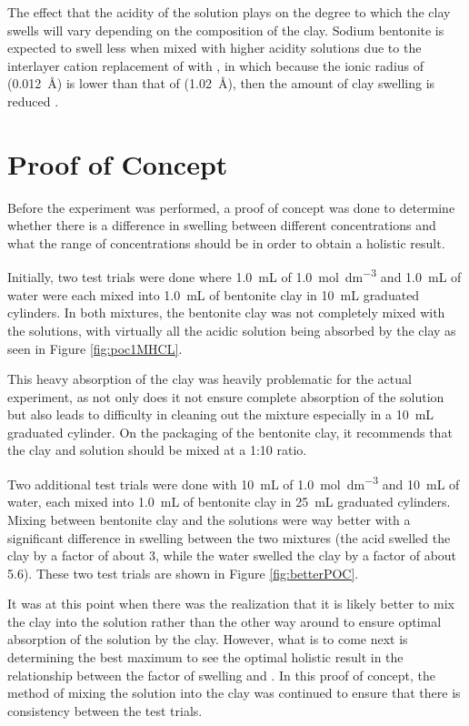 \documentclass[11pt, letterpaper]{article}
\begin{document}
The effect that the acidity of the solution plays on the degree to which
the clay swells will vary depending on the composition of the clay.
Sodium bentonite is expected to swell less when mixed with higher acidity
solutions due to the interlayer cation replacement
of  with , in which because the
ionic radius of  (\SI{0.012}{\angstrom})
is lower than that of  (\SI{1.02}{\angstrom}),
then the amount of clay swelling is reduced \cite{ramavaraprasadSwellingCharacteristicsSoils2018a}.


\section{Proof of Concept}

Before the experiment was performed, a proof of concept
was done to determine whether there is a difference
in swelling between different concentrations and what the
range of concentrations should be in order to obtain
a holistic result.

Initially, two test trials were done where \SI{1.0}{mL} of
\SI{1.0}{mol.dm^{-3}}  and \SI{1.0}{mL} of water
were each mixed into \SI{1.0}{mL} of bentonite clay in
\SI{10}{mL} graduated cylinders. In both mixtures, the
bentonite clay was not completely mixed with the solutions,
with virtually all the acidic solution being absorbed by the
clay as seen in Figure \ref*{fig:poc1MHCL}.

This heavy absorption of the clay was heavily problematic
for the actual experiment, as not only does it not ensure
complete absorption of the solution but also leads to difficulty
in cleaning out the mixture especially in a \SI{10}{mL} graduated
cylinder. On the packaging of the bentonite clay, it recommends
that the clay and solution should be mixed at a 1:10 ratio.

Two additional test trials were done with \SI{10}{mL} of
\SI{1.0}{mol.dm^{-3}}  and \SI{10}{mL} of water,
each mixed into \SI{1.0}{mL} of bentonite clay in
\SI{25}{mL} graduated cylinders. Mixing between
bentonite clay and the solutions were way better with a
significant difference in swelling between the two mixtures
(the acid swelled the clay by a factor of about 3, while
the water swelled the clay by a factor of about 5.6).
These two test trials are shown in Figure \ref*{fig:betterPOC}.

It was at this point when there was the realization that it
is likely better to mix the clay into the solution rather than
the other way around to ensure optimal absorption of the solution
by the clay. However, what is to come next is determining the
best maximum \ce{[H+]} to see the optimal holistic result
in the relationship between the factor of swelling and \ce{[H+]}.
In this proof of concept, the method of mixing the solution
into the clay was continued to ensure that there is consistency
between the test trials.
\end{document}

